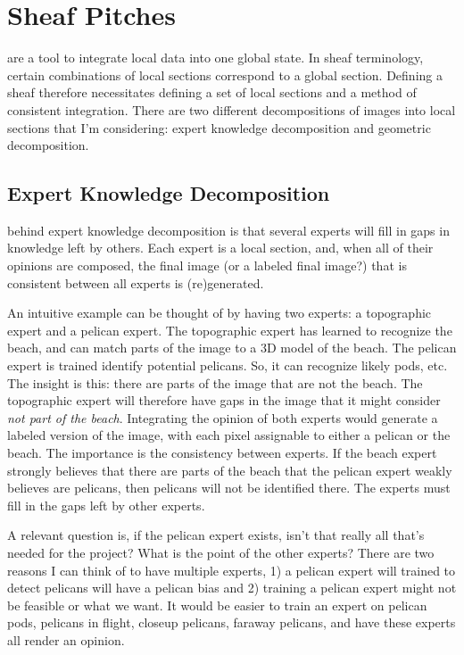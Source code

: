 \chapter{Sheaf Pitches}

 are a tool to integrate local data into one global state.
In sheaf terminology, certain combinations of local sections correspond to a
global section. Defining a sheaf therefore necessitates defining a set of local
sections and a method of consistent integration. There are two different
decompositions of images into local sections that I'm considering: expert
knowledge decomposition and geometric decomposition.

\section{Expert Knowledge Decomposition}

 behind expert knowledge decomposition is that
several experts will fill in gaps in knowledge left by others. Each expert is a
local section, and, when all of their opinions are composed, the final image
(or a labeled final image?)  that is consistent between all experts is
(re)generated.

An intuitive example can be thought of by having two experts: a topographic
expert and a pelican expert. The topographic expert has learned to recognize
the beach, and can match parts of the image to a 3D model of the beach. The
pelican expert is trained identify potential pelicans. So, it can recognize
likely pods, etc. The insight is this: there are parts of the image that are
not the beach. The topographic expert will therefore have gaps in the image
that it might consider \emph{not part of the beach}. Integrating the opinion of
both experts would generate a labeled version of the image, with each pixel
assignable to either a pelican or the beach. The importance is the consistency
between experts. If the beach expert strongly believes that there are parts of
the beach that the pelican expert weakly believes are pelicans, then pelicans
will not be identified there. The experts must fill in the gaps left by other
experts.

A relevant question is, if the pelican expert exists, isn't that really all
that's needed for the project? What is the point of the other experts? There
are two reasons I can think of to have multiple experts, 1) a pelican expert
will trained to detect pelicans will have a pelican bias and 2) training a
pelican expert might not be feasible or what we want. It would be easier to
train an expert on pelican pods, pelicans in flight, closeup pelicans, faraway
pelicans, and have these experts all render an opinion.

